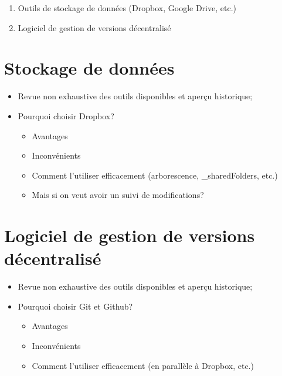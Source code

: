 \documentclass[
  letterpaper,
  DIV=11,
  numbers=noendperiod]{scrreprt}
\providecommand{\tightlist}{%
  \setlength{\itemsep}{0pt}\setlength{\parskip}{0pt}}\usepackage{longtable,booktabs,array}
\begin{document}
\begin{enumerate}
\def\labelenumi{\arabic{enumi}.}
\tightlist
\item
  Outils de stockage de données (Dropbox, Google Drive, etc.)
\item
  Logiciel de gestion de versions décentralisé
\end{enumerate}

\hypertarget{stockage-de-donnuxe9es}{%
\section{Stockage de données}\label{stockage-de-donnuxe9es}}

\begin{itemize}
\tightlist
\item
  Revue non exhaustive des outils disponibles et aperçu historique;
\item
  Pourquoi choisir Dropbox?

  \begin{itemize}
  \tightlist
  \item
    Avantages
  \item
    Inconvénients
  \item
    Comment l'utiliser efficacement (arborescence, \_sharedFolders,
    etc.)
  \item
    Mais si on veut avoir un suivi de modifications?
  \end{itemize}
\end{itemize}

\hypertarget{logiciel-de-gestion-de-versions-duxe9centralisuxe9}{%
\section{Logiciel de gestion de versions
décentralisé}\label{logiciel-de-gestion-de-versions-duxe9centralisuxe9}}

\begin{itemize}
\tightlist
\item
  Revue non exhaustive des outils disponibles et aperçu historique;
\item
  Pourquoi choisir Git et Github?

  \begin{itemize}
  \tightlist
  \item
    Avantages
  \item
    Inconvénients
  \item
    Comment l'utiliser efficacement (en parallèle à Dropbox, etc.)
  \end{itemize}
\end{itemize}
\end{document}
